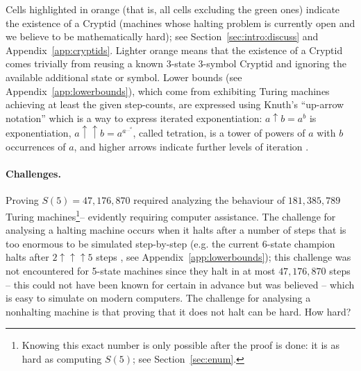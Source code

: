 \documentclass[a4paper,british]{article}
\theoremstyle{definition} %
\numberwithin{equation}{section}
\theoremstyle{definition} %
\newcommand{\BBtheFifth}{47{,}176{,}870}
\newcommand{\BBtheFifthTNF}{181{,}385{,}789}
\begin{document}
\begin{table}[h]
{        Cells highlighted in orange (that is, all cells excluding the green ones) indicate the existence of a Cryptid (\ie machines whose halting problem is currently open and we believe to be mathematically hard); see Section~\ref{sec:intro:discuss} and Appendix~\ref{app:cryptids}. Lighter orange means that the existence of a Cryptid comes trivially from reusing a known 3-state 3-symbol Cryptid and ignoring the available additional state or symbol. Lower bounds (see Appendix~\ref{app:lowerbounds}), which come from exhibiting Turing machines achieving at least the given step-counts, are expressed using Knuth's ``up-arrow notation'' which is a way to express iterated exponentiation:
        $a \uparrow b = a^b$ is exponentiation,
        $a \uparrow\uparrow b = a^{a^{\dots^a}}$, called tetration, is a tower of powers of $a$ with $b$ occurrences of $a$,
        and higher arrows indicate further levels of iteration \cite{Knuth1976Coping}.
    }
    \label{table:landscape}
\end{table}

\vspace{-2ex}
\paragraph{Challenges.} Proving $S(5) = \BBtheFifth$ required analyzing the behaviour of $\BBtheFifthTNF$ Turing machines\footnote{Knowing this exact number is only possible after the proof is done: it is as hard as computing $S(5)$; see Section~\ref{sec:enum}.}-- evidently requiring computer assistance. The challenge for analysing a halting machine occurs when it halts after a number of steps that is too enormous to be simulated step-by-step (e.g. the current 6-state champion halts after $2 \uparrow \uparrow \uparrow 5$ steps \cite{Pavel_discorvery}, see Appendix~\ref{app:lowerbounds}); this challenge was not encountered for 5-state machines since they halt in at most $\BBtheFifth$ steps -- this could not have been known for certain in advance but was believed -- which is easy to simulate on modern computers. The challenge for analysing a nonhalting machine is that proving that it does not halt can be hard. How hard?
\end{document}
